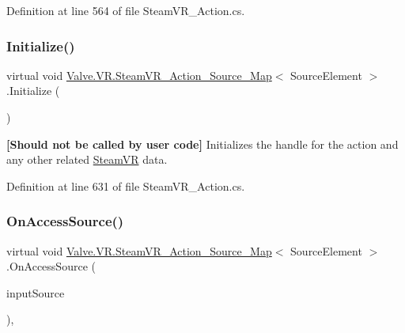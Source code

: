 Definition at line 564 of file Steam\+V\+R\+\_\+\+Action.\+cs.

\mbox{\label{class_valve_1_1_v_r_1_1_steam_v_r___action___source___map_aa673cb451bc9b3fcc7ce8a7b95d407d6}} 
\subsubsection{\texorpdfstring{Initialize()}{Initialize()}\hspace{0.1cm}{\footnotesize\ttfamily [2/2]}}
{\footnotesize\ttfamily virtual void \mbox{\hyperlink{class_valve_1_1_v_r_1_1_steam_v_r___action___source___map}{Valve.\+V\+R.\+Steam\+V\+R\+\_\+\+Action\+\_\+\+Source\+\_\+\+Map}}$<$ Source\+Element $>$.Initialize (\begin{DoxyParamCaption}{ }\end{DoxyParamCaption})\hspace{0.3cm}{\ttfamily [virtual]}}



{\bfseries{\mbox{[}Should not be called by user code\mbox{]}}} Initializes the handle for the action and any other related \mbox{\hyperlink{class_valve_1_1_v_r_1_1_steam_v_r}{Steam\+VR}} data. 



Definition at line 631 of file Steam\+V\+R\+\_\+\+Action.\+cs.

\mbox{\label{class_valve_1_1_v_r_1_1_steam_v_r___action___source___map_a2a6c76774adb5719065c870202c4f29a}} 
\subsubsection{\texorpdfstring{OnAccessSource()}{OnAccessSource()}}
{\footnotesize\ttfamily virtual void \mbox{\hyperlink{class_valve_1_1_v_r_1_1_steam_v_r___action___source___map}{Valve.\+V\+R.\+Steam\+V\+R\+\_\+\+Action\+\_\+\+Source\+\_\+\+Map}}$<$ Source\+Element $>$.On\+Access\+Source (\begin{DoxyParamCaption}\item[{\mbox{\hyperlink{namespace_valve_1_1_v_r_a82e5bf501cc3aa155444ee3f0662853f}{Steam\+V\+R\+\_\+\+Input\+\_\+\+Sources}}}]{input\+Source }\end{DoxyParamCaption})\hspace{0.3cm}{\ttfamily [protected]}, {\ttfamily [virtual]}}



